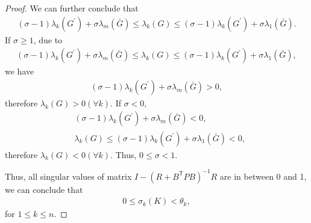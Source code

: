 \documentclass{article}
\newcommand{\transpose}{\mathsf{T}}
\begin{document}
\begin{proof}
     We can further conclude that
     \begin{align}
         (\sigma-1)\lambda_{k}(G^{'})+\sigma\lambda_{m}(\bar{G}) \leq \lambda_{k}(G) \leq (\sigma-1)\lambda_{k}(G^{'})+\sigma\lambda_{1}(\bar{G}).
     \end{align}
     If $\sigma \geq 1$, due to
     \begin{align}
         (\sigma-1)\lambda_{k}(G^{'})+\sigma\lambda_{m}(\bar{G}) \leq \lambda_{k}(G) \leq (\sigma-1)\lambda_{k}(G^{'})+\sigma\lambda_{1}(\bar{G}),
     \end{align}
     we have
     \begin{align*}
         (\sigma-1)\lambda_{k}(G^{'})+\sigma\lambda_{m}(\bar{G}) > 0,
     \end{align*}
     therefore $\lambda_{k}(G) > 0(\forall k)$. If $\sigma < 0$, 
     \begin{align*}
         &(\sigma-1)\lambda_{k}(G^{'})+\sigma\lambda_{m}(\bar{G}) < 0,\\
         &\lambda_{k}(G) \leq (\sigma-1)\lambda_{k}(G^{'})+\sigma\lambda_{1}(\bar{G}) < 0,
     \end{align*}
     therefore $\lambda_{k}(G) < 0(\forall k)$. Thus, $0 \leq \sigma < 1$.

    Thus, all singular values of matrix $I - (R+B^{\transpose}PB)^{-1}R$ are in between 0 and 1, we can conclude that
    \begin{align}
        0 \leq \sigma_{k}(K) < \theta_{k},
    \end{align}
    for $1\leq k \leq n$.
    

\end{proof}
\end{document}
